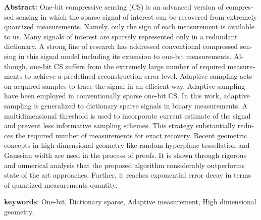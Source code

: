 \newpage
\thispagestyle{empty}
\begin{latin}
\textbf{Abstract:}
One-bit compressive sensing (CS) is an advanced version of compressed sensing in which the sparse signal of interest can be recovered from extremely quantized measurements. Namely, only the sign of each measurement is available to us. Many signals of interest are sparsely represented only in a redundant dictionary. A strong line of research has addressed conventional compressed sensing in this signal model including its extension to one-bit measurements. Although, one-bit CS suffers from the extremely large number of required measurements to achieve a predefined reconstruction error level. Adaptive sampling acts on acquired samples to trace the signal in an efficient way. Adaptive sampling have been employed in conventionally sparse one-bit CS. In this work, adaptive sampling is generalized to dictionary sparse signals in binary measurements. A multidimensional threshold is used to incorporate current estimate of the signal and prevent less informative sampling schemes. This strategy substantially reduces the required number of measurements for exact recovery. Recent geometric concepts in high dimensional geometry like random hyperplane tessellation and Gaussian width are used in the process of proofs. It is shown through rigorous and numerical analysis that the proposed algorithm considerably outperforms state of the art approaches. Further, it reaches exponential error decay in terms of quantized measurements quantity.


\textbf{keywords}: 
One-bit, Dictionary sparse, Adaptive measurement, High dimensional geometry.
\end{latin}
\newpage
\thispagestyle{empty}
\vspace*{-28mm}

